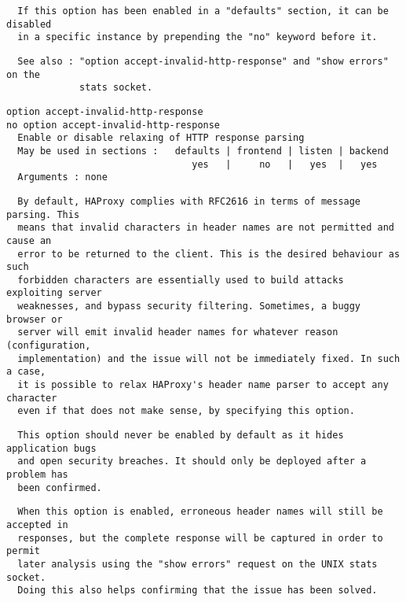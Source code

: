 \begin{verbatim}
  If this option has been enabled in a "defaults" section, it can be disabled
  in a specific instance by prepending the "no" keyword before it.
\end{verbatim}

\begin{verbatim}
  See also : "option accept-invalid-http-response" and "show errors" on the
             stats socket.
\end{verbatim}

\begin{verbatim}
option accept-invalid-http-response
no option accept-invalid-http-response
  Enable or disable relaxing of HTTP response parsing
  May be used in sections :   defaults | frontend | listen | backend
                                 yes   |     no   |   yes  |   yes
  Arguments : none
\end{verbatim}

\begin{verbatim}
  By default, HAProxy complies with RFC2616 in terms of message parsing. This
  means that invalid characters in header names are not permitted and cause an
  error to be returned to the client. This is the desired behaviour as such
  forbidden characters are essentially used to build attacks exploiting server
  weaknesses, and bypass security filtering. Sometimes, a buggy browser or
  server will emit invalid header names for whatever reason (configuration,
  implementation) and the issue will not be immediately fixed. In such a case,
  it is possible to relax HAProxy's header name parser to accept any character
  even if that does not make sense, by specifying this option.
\end{verbatim}

\begin{verbatim}
  This option should never be enabled by default as it hides application bugs
  and open security breaches. It should only be deployed after a problem has
  been confirmed.
\end{verbatim}

\begin{verbatim}
  When this option is enabled, erroneous header names will still be accepted in
  responses, but the complete response will be captured in order to permit
  later analysis using the "show errors" request on the UNIX stats socket.
  Doing this also helps confirming that the issue has been solved.
\end{verbatim}

